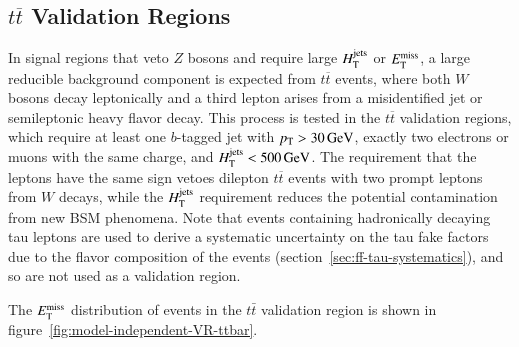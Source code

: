 \subsection{$t\overline{t}$ Validation Regions}\label{sec:model-independent-validation-regions-ttbar}
In signal regions that veto $Z$ bosons and require large $H_{\mathrm{T}}^{\mathrm{jets}}$ or $E_{\text{T}}^{\text{miss}}$, a large reducible background component is expected from $t\overline{t}$ events, where both $W$ bosons decay leptonically and a third lepton arises from a misidentified jet or semileptonic heavy flavor decay. This process is tested in the $t\overline{t}$ validation regions, which require at least one $b$-tagged jet with $p_{\text{T}}>\SI{30}{\giga\electronvolt}$, exactly two electrons or muons with the same charge, and $H_{\mathrm{T}}^{\mathrm{jets}}<\SI{500}{\giga\electronvolt}$. The requirement that the leptons have the same sign vetoes dilepton $t\overline{t}$ events with two prompt leptons from $W$ decays, while the $H_{\mathrm{T}}^{\mathrm{jets}}$ requirement reduces the potential contamination from new BSM phenomena. Note that events containing hadronically decaying tau leptons are used to derive a systematic uncertainty on the tau fake factors due to the flavor composition of the events (section~\ref{sec:ff-tau-systematics}), and so are not used as a validation region. 


The $E_{\text{T}}^{\text{miss}}$ distribution of events in the $t\bar{t}$ validation region is shown in figure~\ref{fig:model-independent-VR-ttbar}.

